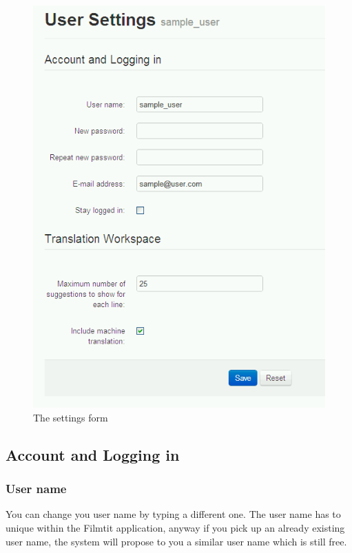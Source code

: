 \begin{figure}
\begin{center}
\includegraphics[scale=0.4]{figures/user_manual/user_settings.png}
\end{center}
\caption{The settings form}
\end{figure}

\subsection{Account and Logging in}
\subsubsection{User name}

You can change you user name by typing a different one. The user name has to unique within the Filmtit application, anyway if you pick up an already existing user name, the system will propose to you a similar user name which is still free.

